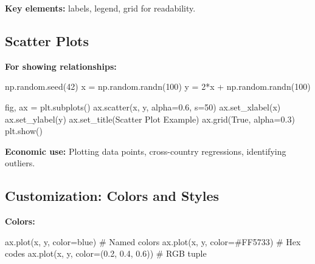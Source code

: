 \documentclass[
  letterpaper,
  DIV=11,
  numbers=noendperiod]{scrartcl}
\newenvironment{Shaded}{\begin{snugshade}}{\end{snugshade}}
\newcommand{\CommentTok}[1]{\textcolor[rgb]{0.37,0.37,0.37}{#1}}
\newcommand{\DecValTok}[1]{\textcolor[rgb]{0.68,0.00,0.00}{#1}}
\newcommand{\FloatTok}[1]{\textcolor[rgb]{0.68,0.00,0.00}{#1}}
\newcommand{\NormalTok}[1]{\textcolor[rgb]{0.00,0.23,0.31}{#1}}
\newcommand{\OperatorTok}[1]{\textcolor[rgb]{0.37,0.37,0.37}{#1}}
\newcommand{\StringTok}[1]{\textcolor[rgb]{0.13,0.47,0.30}{#1}}
\newcommand{\VariableTok}[1]{\textcolor[rgb]{0.07,0.07,0.07}{#1}}
\begin{document}
\textbf{Key elements:} labels, legend, grid for readability.

\subsection{Scatter Plots}\label{scatter-plots}

\textbf{For showing relationships:}

\begin{Shaded}
\begin{Highlighting}[]
\NormalTok{np.random.seed(}\DecValTok{42}\NormalTok{)}
\NormalTok{x }\OperatorTok{=}\NormalTok{ np.random.randn(}\DecValTok{100}\NormalTok{)}
\NormalTok{y }\OperatorTok{=} \DecValTok{2}\OperatorTok{*}\NormalTok{x }\OperatorTok{+}\NormalTok{ np.random.randn(}\DecValTok{100}\NormalTok{)}

\NormalTok{fig, ax }\OperatorTok{=}\NormalTok{ plt.subplots()}
\NormalTok{ax.scatter(x, y, alpha}\OperatorTok{=}\FloatTok{0.6}\NormalTok{, s}\OperatorTok{=}\DecValTok{50}\NormalTok{)}
\NormalTok{ax.set\_xlabel(}\StringTok{\textquotesingle{}x\textquotesingle{}}\NormalTok{)}
\NormalTok{ax.set\_ylabel(}\StringTok{\textquotesingle{}y\textquotesingle{}}\NormalTok{)}
\NormalTok{ax.set\_title(}\StringTok{\textquotesingle{}Scatter Plot Example\textquotesingle{}}\NormalTok{)}
\NormalTok{ax.grid(}\VariableTok{True}\NormalTok{, alpha}\OperatorTok{=}\FloatTok{0.3}\NormalTok{)}
\NormalTok{plt.show()}
\end{Highlighting}
\end{Shaded}

\textbf{Economic use:} Plotting data points, cross-country regressions,
identifying outliers.

\subsection{Customization: Colors and
Styles}\label{customization-colors-and-styles}

\textbf{Colors:}

\begin{Shaded}
\begin{Highlighting}[]
\NormalTok{ax.plot(x, y, color}\OperatorTok{=}\StringTok{\textquotesingle{}blue\textquotesingle{}}\NormalTok{)     }\CommentTok{\# Named colors}
\NormalTok{ax.plot(x, y, color}\OperatorTok{=}\StringTok{\textquotesingle{}\#FF5733\textquotesingle{}}\NormalTok{)  }\CommentTok{\# Hex codes}
\NormalTok{ax.plot(x, y, color}\OperatorTok{=}\NormalTok{(}\FloatTok{0.2}\NormalTok{, }\FloatTok{0.4}\NormalTok{, }\FloatTok{0.6}\NormalTok{))  }\CommentTok{\# RGB tuple}
\end{Highlighting}
\end{Shaded}
\end{document}
